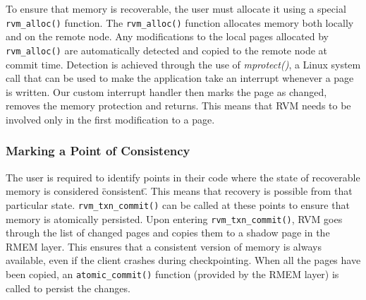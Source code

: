 To ensure that memory is recoverable, the user must allocate it using a special
\verb|rvm_alloc()| function. The \verb|rvm_alloc()| function allocates memory
both locally and on the remote node. Any modifications to the local pages
allocated by \verb|rvm_alloc()| are automatically detected and copied to the
remote node at commit time. Detection is achieved through the use of
\emph{mprotect()}, a Linux system call that can be used to make the application
take an interrupt whenever a page is written. Our custom interrupt handler
then marks the page as changed, removes the memory protection and returns. This
means that RVM needs to be involved only in the first modification to a page.

\subsubsection{Marking a Point of Consistency}

The user is required to identify points in their code where the state of
recoverable memory is considered \"consistent\". This means that recovery is
possible from that particular state. \verb|rvm_txn_commit()| can be called at
these points to ensure that memory is atomically persisted. Upon entering
\verb|rvm_txn_commit()|, RVM goes through the list of changed pages and copies
them to a shadow page in the RMEM layer. This ensures that a consistent version
of memory is always available, even if the client crashes during checkpointing.
When all the pages have been copied, an \verb|atomic_commit()| function
(provided by the RMEM layer) is called to persist the changes.

